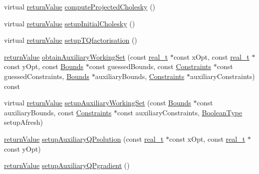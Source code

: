 \begin{DoxyCompactItemize}
\item 
virtual \hyperlink{_message_handling_8hpp_a81d556f613bfbabd0b1f9488c0fa865e}{return\+Value} \hyperlink{class_q_problem_a0708ec4315696dd5462406cd0910bee2}{compute\+Projected\+Cholesky} ()
\item 
virtual \hyperlink{_message_handling_8hpp_a81d556f613bfbabd0b1f9488c0fa865e}{return\+Value} \hyperlink{class_q_problem_acb3d279975d00e5e459af3a7bb056658}{setup\+Initial\+Cholesky} ()
\item 
virtual \hyperlink{_message_handling_8hpp_a81d556f613bfbabd0b1f9488c0fa865e}{return\+Value} \hyperlink{class_q_problem_a08d6dfbf81516910e5d7af60f4f67faa}{setup\+T\+Qfactorisation} ()
\item 
\hyperlink{_message_handling_8hpp_a81d556f613bfbabd0b1f9488c0fa865e}{return\+Value} \hyperlink{class_q_problem_a2ed2bcda976c263ff65d9ba0c2971a1e}{obtain\+Auxiliary\+Working\+Set} (const \hyperlink{qp_o_a_s_e_s__wrapper_8h_a0d00e2b3dfadee81331bbb39068570c4}{real\+\_\+t} $\ast$const x\+Opt, const \hyperlink{qp_o_a_s_e_s__wrapper_8h_a0d00e2b3dfadee81331bbb39068570c4}{real\+\_\+t} $\ast$const y\+Opt, const \hyperlink{class_bounds}{Bounds} $\ast$const guessed\+Bounds, const \hyperlink{class_constraints}{Constraints} $\ast$const guessed\+Constraints, \hyperlink{class_bounds}{Bounds} $\ast$auxiliary\+Bounds, \hyperlink{class_constraints}{Constraints} $\ast$auxiliary\+Constraints) const
\item 
virtual \hyperlink{_message_handling_8hpp_a81d556f613bfbabd0b1f9488c0fa865e}{return\+Value} \hyperlink{class_q_problem_a1779e923a5f84cdddd33bbe38735f58c}{setup\+Auxiliary\+Working\+Set} (const \hyperlink{class_bounds}{Bounds} $\ast$const auxiliary\+Bounds, const \hyperlink{class_constraints}{Constraints} $\ast$const auxiliary\+Constraints, \hyperlink{_types_8hpp_a20f82124c82b6f5686a7fce454ef9089}{Boolean\+Type} setup\+Afresh)
\item 
\hyperlink{_message_handling_8hpp_a81d556f613bfbabd0b1f9488c0fa865e}{return\+Value} \hyperlink{class_q_problem_a393d3526ea02bb6ec26896c857f70bb6}{setup\+Auxiliary\+Q\+Psolution} (const \hyperlink{qp_o_a_s_e_s__wrapper_8h_a0d00e2b3dfadee81331bbb39068570c4}{real\+\_\+t} $\ast$const x\+Opt, const \hyperlink{qp_o_a_s_e_s__wrapper_8h_a0d00e2b3dfadee81331bbb39068570c4}{real\+\_\+t} $\ast$const y\+Opt)
\item 
\hyperlink{_message_handling_8hpp_a81d556f613bfbabd0b1f9488c0fa865e}{return\+Value} \hyperlink{class_q_problem_a20876832f9f362aa98ae9fde45713297}{setup\+Auxiliary\+Q\+Pgradient} ()
\item 

\end{DoxyCompactItemize}
